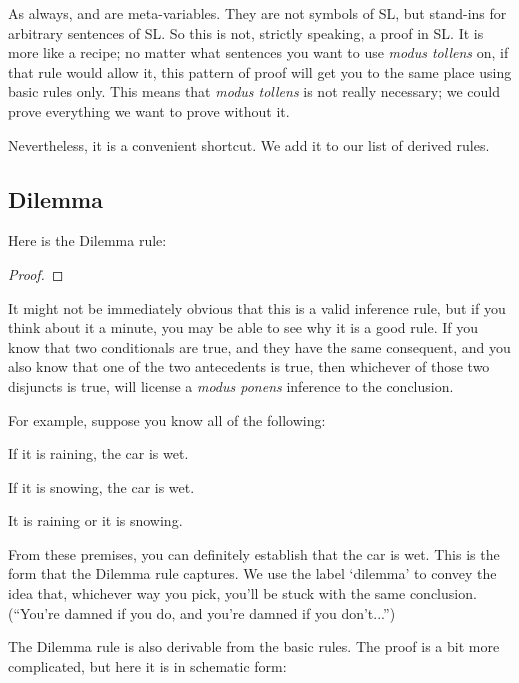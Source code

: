 As always,  \metaA{} and \metaB{} are meta-variables. They are not symbols of SL, but stand-ins for arbitrary sentences of SL. So this is not, strictly speaking, a proof in SL. It is more like a recipe; no matter what sentences you want to use \emph{modus tollens} on, if that rule would allow it, this pattern of proof will get you to the same place using basic rules only. This means that \emph{modus tollens} is not really necessary; we could prove everything we want to prove without it.

Nevertheless, it is a convenient shortcut. We add it to our list of derived rules.

\subsection{Dilemma}


Here is the Dilemma rule:

\begin{proof}
	 
\end{proof}

It might not be immediately obvious that this is a valid inference rule, but if you think about it a minute, you may be able to see why it is a good rule. If you know that two conditionals are true, and they have the same consequent, and you also know that one of the two antecedents is true, then whichever of those two disjuncts is true, will license a \emph{modus ponens} inference to the conclusion.

For example, suppose you know all of the following:

\begin{earg}
\item[] If it is raining, the car is wet.
\item[] If it is snowing, the car is wet.
\item[] It is raining or it is snowing.
\end{earg}

From these premises, you can definitely establish that the car is wet. This is the form that the Dilemma rule captures. We use the label `dilemma' to convey the idea that, whichever way you pick, you'll be stuck with the same conclusion. (``You're damned if you do, and you're damned if you don't...'')

The Dilemma rule is also derivable from the basic rules. The proof is a bit more complicated, but here it is in schematic form:

